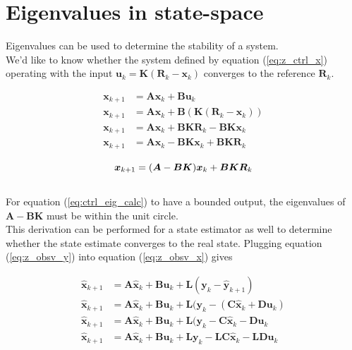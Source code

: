 \documentclass[10pt,conference,compsoc]{IEEEtran}
\newcommand{\mtx}[1] {\bm #1}
\begin{document}
\section{Eigenvalues in state-space}

\noindent Eigenvalues can be used to determine the stability of a system. \\

\noindent We'd like to know whether the system defined by equation
(\ref{eq:z_ctrl_x}) operating with the input
$\mtx{u}_k = \mtx{K}(\mtx{R}_k - \mtx{x}_k)$ converges to the reference
$\mtx{R}_k$.

\begin{align*}
  \mtx{x}_{k+1} &= \mtx{A}\mtx{x}_k + \mtx{B}\mtx{u}_k \\
  \mtx{x}_{k+1} &= \mtx{A}\mtx{x}_k + \mtx{B}(\mtx{K}(\mtx{R}_k - \mtx{x}_k)) \\
  \mtx{x}_{k+1} &= \mtx{A}\mtx{x}_k + \mtx{B}\mtx{K}\mtx{R}_k -
    \mtx{B}\mtx{K}\mtx{x}_k \\
  \mtx{x}_{k+1} &= \mtx{A}\mtx{x}_k - \mtx{B}\mtx{K}\mtx{x}_k +
    \mtx{B}\mtx{K}\mtx{R}_k
\end{align*}

\begin{equation} \label{eq:ctrl_eig_calc}
  \mtx{x}_{k+1} = (\mtx{A} - \mtx{B}\mtx{K})\mtx{x}_k +
    \mtx{B}\mtx{K}\mtx{R}_k \\
\end{equation}
\\
\noindent For equation (\ref{eq:ctrl_eig_calc}) to have a bounded output, the
eigenvalues of $\mtx{A} - \mtx{B}\mtx{K}$ must be within the unit circle. \\

\noindent This derivation can be performed for a state estimator as well to
determine whether the state estimate converges to the real state. Plugging
equation (\ref{eq:z_obsv_y}) into equation (\ref{eq:z_obsv_x}) gives

\begin{align*}
  \hat{\mtx{x}}_{k+1} &= \mtx{A}\hat{\mtx{x}}_k + \mtx{B}\mtx{u}_k +
    \mtx{L} (\mtx{y}_k - \hat{\mtx{y}}_{k+1}) \\
  \hat{\mtx{x}}_{k+1} &= \mtx{A}\hat{\mtx{x}}_k + \mtx{B}\mtx{u}_k +
    \mtx{L} (\mtx{y}_k - (\mtx{C}\hat{\mtx{x}}_k + \mtx{D}\mtx{u}_k) \\
  \hat{\mtx{x}}_{k+1} &= \mtx{A}\hat{\mtx{x}}_k + \mtx{B}\mtx{u}_k +
    \mtx{L} (\mtx{y}_k - \mtx{C}\hat{\mtx{x}}_k - \mtx{D}\mtx{u}_k \\
  \hat{\mtx{x}}_{k+1} &= \mtx{A}\hat{\mtx{x}}_k + \mtx{B}\mtx{u}_k +
    \mtx{L}\mtx{y}_k - \mtx{L}\mtx{C}\hat{\mtx{x}}_k -
    \mtx{L}\mtx{D}\mtx{u}_k \\
\end{align*}
\end{document}
